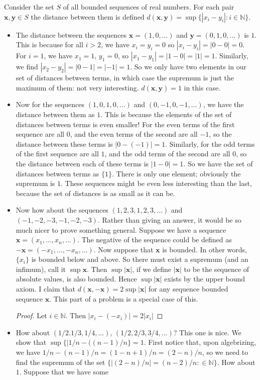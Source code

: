 \documentclass[11pt]{article}
\newcommand{\N}{\mathbb{N}}
\theoremstyle{definition}
\begin{document}
Consider the set $S$ of all bounded sequences of real numbers. For each pair $\mathbf{x},\mathbf{y}\in S$ the distance between them is defined $d(\mathbf{x},\mathbf{y}) = \sup\{|x_i - y_i|: i\in \N\}$.
\begin{itemize}
\item The distance between the sequences $\mathbf{x} = (1,0,\dots)$ and $\mathbf{y} = (0,1,0,\dots)$ is $1$. This is because for all $i>2$, we have $ x_i = y_i = 0$ so $|x_i - y_i|= |0-0| = 0$. For $i = 1$, we have $x_1 = 1$, $y_1 = 0$, so $|x_1-y_1| = |1-0| = |1| = 1$. Similarly, we find $|x_2-y_2| = |0-1| = |-1| = 1$. So we only have two elements in our set of distances between terms, in which case the supremum is just the maximum of them: not very interesting. $d(\mathbf{x},\mathbf{y}) = 1$ in this case.

\item Now for the sequences $(1,0,1,0,\dots)$ and $(0,-1,0,-1,\dots)$, we have the distance between them as $1$. This is because the elements of the set of distances between terms is even smaller! For the even terms of the first sequence are all $0$, and the even terms of the second are all $-1$, so the distance between these terms is $|0-(-1)| = 1$. Similarly, for the odd terms of the first sequence are all $1$, and the odd terms of the second are all $0$, so the distance between each of these terms is $|1-0| = 1$. So we have the set of distances between terms as $\{1\}$. There is only one element; obviously the supremum is $1$. These sequences might be even less interesting than the last, because the set of distances is as small as it can be.

\item Now how about the sequences $(1,2,3,1,2,3,\dots)$ and $(-1,-2,-3,-1,-2,-3)$. Rather than giving an answer, it would be so much nicer to prove something general. Suppose we have a sequence $\mathbf{x} = (x_1,\dots,x_n,\dots)$. The negative of the sequence could be defined as $-\mathbf{x} = (-x_1,\dots,-x_n,\dots)$. Now suppose that $\mathbf{x}$ is bounded. In other words, $\{x_i\}$ is bounded below and above. So there must exist a supremum (and an infimum), call it $\sup \mathbf{x}$. Then $\sup |\mathbf{x}|$, if we define $|\mathbf{x}|$ to be the sequence of absolute values, is also bounded. Hence $\sup|\mathbf{x}|$ exists by the upper bound axiom. I claim that $d(\mathbf{x},-\mathbf{x}) = 2\sup|\mathbf{x}|$ for any sequence bounded sequence $\mathbf{x}$. This part of a problem is a special case of this.
\begin{proof}
Let $i\in \N$. Then $|x_i-(-x_i)| = 2|x_i|$
\end{proof}

\item How about $(1/2.1/3,1/4,\dots)$, $(1/2,2/3,3/4,\dots)$? This one is nice. We show that $\sup\{|1/n - ((n-1)/n\} = 1$. First notice that, upon algebrizing, we have $1/n - (n-1)/n = (1-n+1)/n = (2-n)/n$, so we need to find the supremum of the set $\{|(2-n)/n| = (n-2)/n:\in \N\}$. How about $1$. Suppose that we have some 
\end{itemize}
\end{document}
